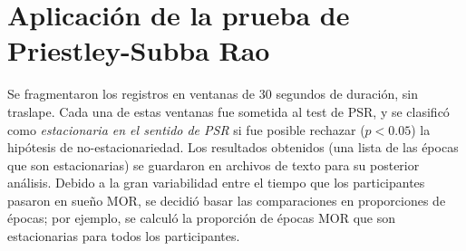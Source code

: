 %
%


\section{Aplicación de la prueba de Priestley-Subba Rao}

Se fragmentaron los registros en ventanas de 30 segundos de duración, sin
traslape. Cada una de estas ventanas fue sometida al test de PSR, y se clasificó como 
\textit{estacionaria en el sentido de PSR} si fue posible rechazar ($p<0.05$) la hipótesis de 
no-estacionariedad. 
%
Los resultados obtenidos (una lista de las épocas que son estacionarias) se guardaron en archivos 
de texto para su posterior análisis. 
%
Debido a la gran variabilidad entre el tiempo que los participantes pasaron en sueño MOR, se decidió
basar las comparaciones en proporciones de épocas; por ejemplo, se calculó la proporción de
épocas MOR que son estacionarias para todos los participantes.

